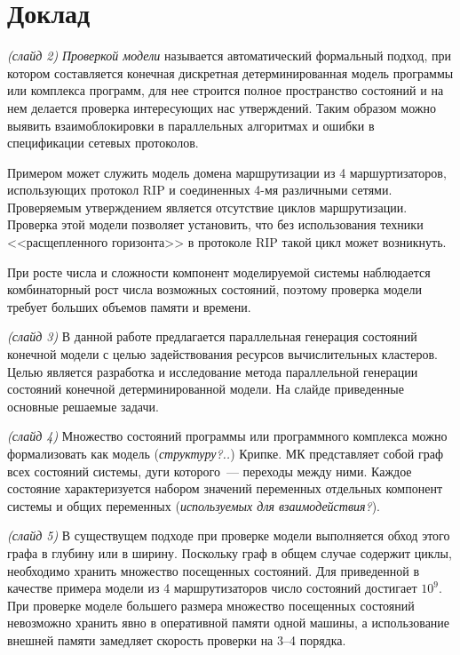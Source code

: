 \documentclass[a4paper,12pt,notitlepage]{article}
\begin{document}
\section{Доклад}

\emph{(слайд 2)} \emph{Проверкой модели} называется автоматический формальный подход, при
котором составляется конечная дискретная детерминированная модель программы или комплекса
программ, для нее строится полное пространство состояний и на нем делается проверка
интересующих нас утверждений. Таким образом можно выявить взаимоблокировки в параллельных
алгоритмах и ошибки в спецификации сетевых протоколов.

Примером может служить модель домена маршрутизации из 4 маршуртизаторов, использующих
протокол RIP и соединенных 4-мя различными сетями. Проверяемым утверждением является
отсутствие циклов маршрутизации. Проверка этой модели позволяет установить, что без
использования техники <<расщепленного горизонта>> в протоколе RIP такой цикл может
возникнуть.

При росте числа и сложности компонент моделируемой системы наблюдается комбинаторный рост
числа возможных состояний, поэтому проверка модели требует больших объемов памяти и
времени.

\emph{(слайд 3)} В данной работе предлагается параллельная генерация состояний конечной
модели с целью задействования ресурсов вычислительных кластеров. Целью является разработка
и исследование метода параллельной генерации состояний конечной детерминированной
модели. На слайде приведенные основные решаемые задачи.

\emph{(слайд 4)} Множество состояний программы или программного комплекса можно
формализовать как модель (\emph{структуру?..}) Крипке. МК представляет собой граф всех
состояний системы, дуги которого~--- переходы между ними. Каждое состояние характеризуется
набором значений переменных отдельных компонент системы и общих переменных
(\emph{используемых для взаимодействия?}).

\emph{(слайд 5)} В существущем подходе при проверке модели выполняется обход этого графа в
глубину или в ширину. Поскольку граф в общем случае содержит циклы, необходимо хранить
множество посещенных состояний. Для приведенной в качестве примера модели из 4
маршрутизаторов число состояний достигает $10^9$. При проверке моделе большего размера
множество посещенных состояний невозможно хранить явно в оперативной памяти одной машины,
а использование внешней памяти замедляет скорость проверки на 3--4 порядка.
\end{document}
